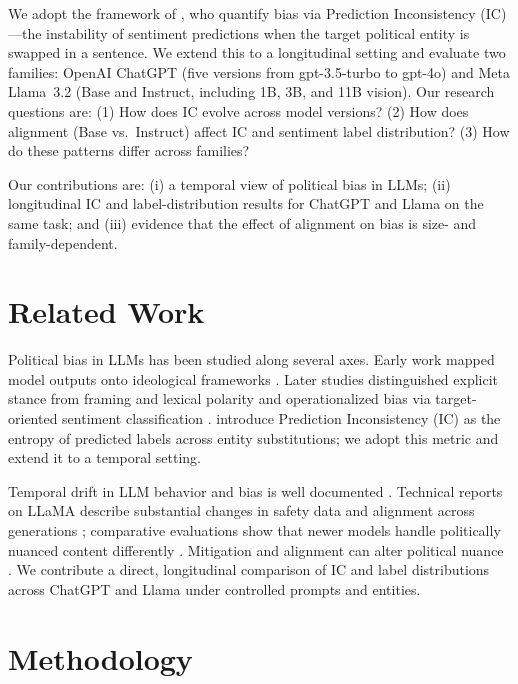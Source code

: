 \documentclass[11pt]{article}
\begin{document}
We adopt the framework of \citet{elbouanani2025}, who quantify bias via Prediction Inconsistency (IC)---the instability of sentiment predictions when the target political entity is swapped in a sentence. We extend this to a longitudinal setting and evaluate two families: OpenAI ChatGPT (five versions from gpt-3.5-turbo to gpt-4o) and Meta Llama~3.2 (Base and Instruct, including 1B, 3B, and 11B vision). Our research questions are: (1) How does IC evolve across model versions? (2) How does alignment (Base vs.\ Instruct) affect IC and sentiment label distribution? (3) How do these patterns differ across families?

Our contributions are: (i) a temporal view of political bias in LLMs; (ii) longitudinal IC and label-distribution results for ChatGPT and Llama on the same task; and (iii) evidence that the effect of alignment on bias is size- and family-dependent.

\section{Related Work}

Political bias in LLMs has been studied along several axes. Early work mapped model outputs onto ideological frameworks \citep{santurkar2023,hartmann2023}. Later studies distinguished explicit stance from framing and lexical polarity \citep{bang2024} and operationalized bias via target-oriented sentiment classification \citep{wang2025,chen2024}. \citet{elbouanani2025} introduce Prediction Inconsistency (IC) as the entropy of predicted labels across entity substitutions; we adopt this metric and extend it to a temporal setting.

Temporal drift in LLM behavior and bias is well documented \citep{zhu2024,buyl2026}. Technical reports on LLaMA describe substantial changes in safety data and alignment across generations \citep{touvron2023,dubey2024}; comparative evaluations show that newer models handle politically nuanced content differently \citep{crum2024}. Mitigation and alignment can alter political nuance \citep{banko2025,bonaldi2024}. We contribute a direct, longitudinal comparison of IC and label distributions across ChatGPT and Llama under controlled prompts and entities.

\section{Methodology}
\end{document}
